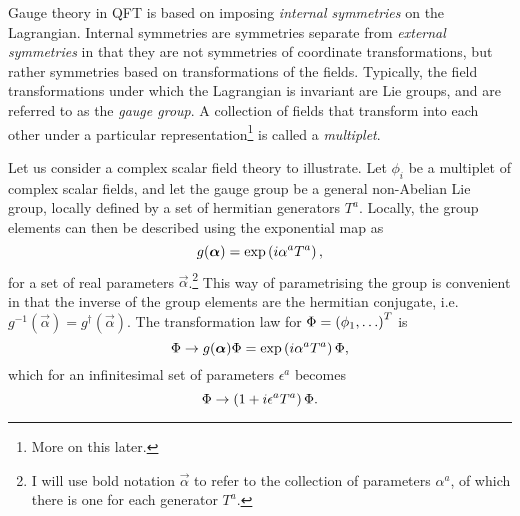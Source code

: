 \documentclass[../main.tex]{subfiles}
\begin{document}
Gauge theory in QFT is based on imposing \emph{internal symmetries} on the Lagrangian.
Internal symmetries are symmetries separate from \emph{external symmetries} in that they are not symmetries of coordinate transformations, but rather symmetries based on transformations of the fields.
Typically, the field transformations under which the Lagrangian is invariant are Lie groups, and are referred to as the \emph{gauge group}.
A collection of fields that transform into each other under a particular representation\footnote{More on this later.} is called a \emph{multiplet}.

Let us consider a complex scalar field theory to illustrate.
Let \(\phi_i\) be a multiplet of complex scalar fields, and let the gauge group be a general non-Abelian Lie group, locally defined by a set of hermitian generators \(T^a\).
Locally, the group elements can then be described using the exponential map as\needcite\
\begin{equation}
  \label{qft:eq:exponential_map}
  g(\boldsymbol{\alpha}) = \operatorname{exp}\left(i \alpha^a T^a\right),
\end{equation}
for a set of real parameters \(\vec{\alpha}\).\footnote{I will use bold
  notation \(\vec\alpha\) to refer to the collection of parameters
  \(\alpha^a\), of which there is one for each generator \(T^a\).}
This way of parametrising the group is convenient in that the inverse of the group elements are the hermitian conjugate, i.e.\ \(g^{-1}(\vec\alpha) = g^\dagger(\vec{\alpha})\).
The transformation law for \(\Phi = \left(\phi_1, \ldots\right)^T\) is
\begin{equation}
  \label{qft:eq:gauge_transformation}
  \Phi \to g(\boldsymbol{\alpha}) \Phi = \operatorname{exp}\left(i \alpha^a T^a\right) \Phi,
\end{equation}
which for an infinitesimal set of parameters \(\epsilon^a\) becomes
\begin{equation}
  \Phi \to \left(1 + i \epsilon^a T^a\right) \Phi.
\end{equation}
\medskip
\end{document}
